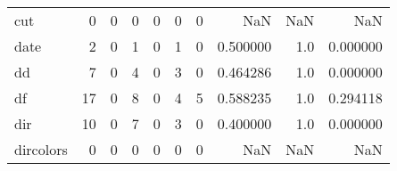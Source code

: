 \begin{tabular}{lrrrrrrrrr}
cut       &                                                  0 &                                                  0 &                                                  0 &                                                  0 &                                                  0 &                                                  0 &                                                NaN &                                    NaN &                                  NaN \\
date      &                                                  2 &                                                  0 &                                                  1 &                                                  0 &                                                  1 &                                                  0 &                                           0.500000 &                                    1.0 &                             0.000000 \\
dd        &                                                  7 &                                                  0 &                                                  4 &                                                  0 &                                                  3 &                                                  0 &                                           0.464286 &                                    1.0 &                             0.000000 \\
df        &                                                 17 &                                                  0 &                                                  8 &                                                  0 &                                                  4 &                                                  5 &                                           0.588235 &                                    1.0 &                             0.294118 \\
dir       &                                                 10 &                                                  0 &                                                  7 &                                                  0 &                                                  3 &                                                  0 &                                           0.400000 &                                    1.0 &                             0.000000 \\
dircolors &                                                  0 &                                                  0 &                                                  0 &                                                  0 &                                                  0 &                                                  0 &                                                NaN &                                    NaN &                                  NaN \\

\end{tabular}
